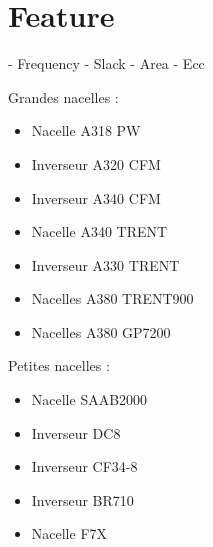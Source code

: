 \chapter{Feature}
- Frequency
- Slack
- Area
- Ecc


\begin{multicols}{2}
Grandes nacelles :
\begin{itemize}
\item Nacelle A318 PW
\item Inverseur A320 CFM
\item Inverseur A340 CFM
\item Nacelle A340 TRENT
\item Inverseur A330 TRENT
\item Nacelles A380 TRENT900
\item Nacelles A380 GP7200
\end{itemize}

\columnbreak

Petites nacelles :
\begin{itemize}
\item Nacelle SAAB2000
\item Inverseur DC8
\item Inverseur CF34-8
\item Inverseur BR710
\item Nacelle F7X
\end{itemize}
\end{multicols}